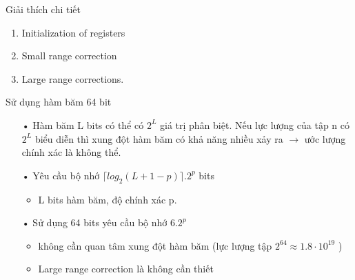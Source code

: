 \documentclass{beamer}
\begin{document}
\begin{frame}{Giải thích chi tiết}
\begin{enumerate}
\item Initialization of registers
\item Small range correction
\item Large range corrections.
\end{enumerate}
\end{frame}
\begin{frame}{Sử dụng hàm băm 64 bit}
\begin{itemize}
\item[•] Hàm băm L bits có thể có $2^L$ giá trị phân biệt. Nếu lực lượng của tập n có $2^L$ biểu diễn thì xung đột hàm băm có khả năng nhiều xảy ra $\rightarrow$ ước lượng chính xác là không thể.
\item[•] Yêu cầu bộ nhớ $\lceil log_2(L + 1 - p) \rceil .2^p$ bits
\begin{itemize}
\item L bits hàm băm, độ chính xác p.
\end{itemize}
\item[•] Sử dụng 64 bits yêu cầu bộ nhớ $6.2^p$
\begin{itemize}
\item không cần quan tâm xung đột hàm băm (lực lượng tập $2^64 \approx 1.8\cdot 10^{19}$ )
\item Large range correction là không cần thiết 
\end{itemize}
\end{itemize}
\end{frame}
\end{document}
